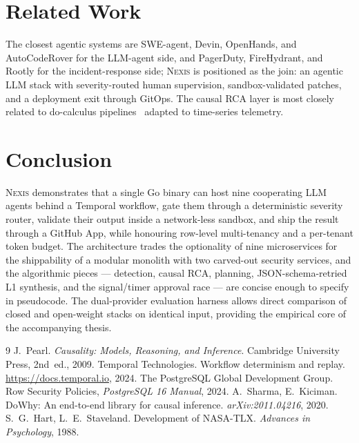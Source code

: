 \documentclass[manuscript,nonacm=true,screen=false,review=false]{acmart}
\begin{document}
\section{Related Work}

The closest agentic systems are SWE-agent, Devin, OpenHands, and AutoCodeRover for the LLM-agent side, and PagerDuty, FireHydrant, and Rootly for the incident-response side; \textsc{Nexis} is positioned as the join: an agentic LLM stack with severity-routed human supervision, sandbox-validated patches, and a deployment exit through GitOps. The causal RCA layer is most closely related to do-calculus pipelines~\cite{pearl2009causality} adapted to time-series telemetry.

\section{Conclusion}

\textsc{Nexis} demonstrates that a single Go binary can host nine cooperating LLM agents behind a Temporal workflow, gate them through a deterministic severity router, validate their output inside a network-less sandbox, and ship the result through a GitHub App, while honouring row-level multi-tenancy and a per-tenant token budget. The architecture trades the optionality of nine microservices for the shippability of a modular monolith with two carved-out security services, and the algorithmic pieces --- detection, causal RCA, planning, JSON-schema-retried L1 synthesis, and the signal/timer approval race --- are concise enough to specify in pseudocode. The dual-provider evaluation harness allows direct comparison of closed and open-weight stacks on identical input, providing the empirical core of the accompanying thesis.

\begin{thebibliography}{9}
 J.~Pearl. \emph{Causality: Models, Reasoning, and Inference}. Cambridge University Press, 2nd~ed., 2009.
 Temporal Technologies. Workflow determinism and replay. \url{https://docs.temporal.io}, 2024.
 The PostgreSQL Global Development Group. Row Security Policies, \emph{PostgreSQL 16 Manual}, 2024.
 A.~Sharma, E.~Kiciman. DoWhy: An end-to-end library for causal inference. \emph{arXiv:2011.04216}, 2020.
 S.~G.~Hart, L.~E.~Staveland. Development of NASA-TLX. \emph{Advances in Psychology}, 1988.
\end{thebibliography}
\end{document}

